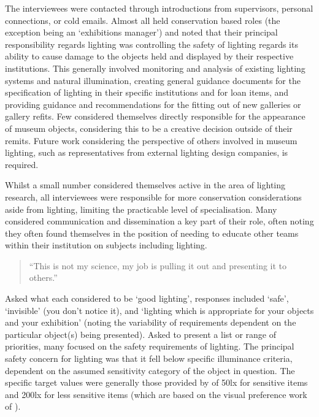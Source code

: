 The interviewees were contacted through introductions from supervisors, personal connections, or cold emails. Almost all held conservation based roles (the exception being an `exhibitions manager') and noted that their principal responsibility regards lighting was controlling the safety of lighting regards its ability to cause damage to the objects held and displayed by their respective institutions. This generally involved monitoring and analysis of existing lighting systems and natural illumination, creating general guidance documents for the specification of lighting in their specific institutions and for loan items, and providing guidance and recommendations for the fitting out of new galleries or gallery refits. Few considered themselves directly responsible for the appearance of museum objects, considering this to be a creative decision outside of their remits. Future work considering the perspective of others involved in museum lighting, such as representatives from external lighting design companies, is required.

Whilst a small number considered themselves active in the area of lighting research, all interviewees were responsible for more conservation considerations aside from lighting, limiting the practicable level of specialisation. Many considered communication and dissemination a key part of their role, often noting they often found themselves in the position of needing to educate other teams within their institution on subjects including lighting. 

\begin{quote}
``This is not my science, my job is pulling it out and presenting it to others.''
\end{quote}

Asked what each considered to be `good lighting', responses included `safe', `invisible' (you don't notice it), and `lighting which is appropriate for your objects and your exhibition' (noting the variability of requirements dependent on the particular object(s) being presented). Asked to present a list or range of priorities, many focused on the safety requirements of lighting. The principal safety concern for lighting was that it fell below specific illuminance criteria, dependent on the assumed sensitivity category of the object in question. The specific target values were generally those provided by \citet{thomson_museum_1986} of 50lx for sensitive items and 200lx for less sensitive items (which are based on the visual preference work of \citet{loe_preferred_1982}).

